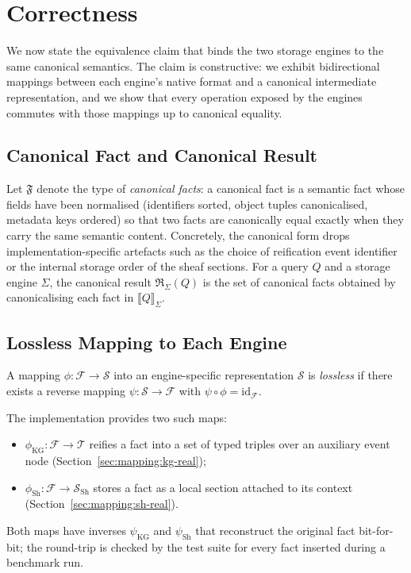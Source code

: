 \section{Correctness}
\label{sec:correctness}

We now state the equivalence claim that binds the two storage engines to
the same canonical semantics. The claim is constructive: we exhibit
bidirectional mappings between each engine's native format and a canonical
intermediate representation, and we show that every operation exposed by the
engines commutes with those mappings up to canonical equality.

\subsection{Canonical Fact and Canonical Result}
\label{sec:correctness:canonical}

Let $\mathfrak{F}$ denote the type of \emph{canonical facts}: a canonical fact
is a semantic fact whose fields have been normalised (identifiers sorted,
object tuples canonicalised, metadata keys ordered) so that two facts are
canonically equal exactly when they carry the same semantic content.
Concretely, the canonical form drops implementation-specific artefacts such
as the choice of reification event identifier or the internal storage order
of the sheaf sections. For a query $Q$ and a storage engine $\Sigma$, the
canonical result $\mathfrak{R}_\Sigma(Q)$ is the set of canonical facts
obtained by canonicalising each fact in $\llbracket Q \rrbracket_\Sigma$.

\subsection{Lossless Mapping to Each Engine}
\label{sec:correctness:lossless}

\begin{definition}
\label{def:lossless}
A mapping $\phi: \mathcal{F} \to \mathcal{S}$ into an engine-specific
representation $\mathcal{S}$ is \emph{lossless} if there exists a reverse
mapping $\psi: \mathcal{S} \to \mathcal{F}$ with $\psi \circ \phi = \mathrm{id}_\mathcal{F}$.
\end{definition}

The implementation provides two such maps:
\begin{itemize}
    \item $\phi_{\mathrm{KG}}: \mathcal{F} \to \mathcal{T}$ reifies a fact
          into a set of typed triples over an auxiliary event node
          (Section~\ref{sec:mapping:kg-real});
    \item $\phi_{\mathrm{Sh}}: \mathcal{F} \to \mathcal{S}_{\mathrm{Sh}}$
          stores a fact as a local section attached to its context
          (Section~\ref{sec:mapping:sh-real}).
\end{itemize}
Both maps have inverses $\psi_{\mathrm{KG}}$ and $\psi_{\mathrm{Sh}}$ that
reconstruct the original fact bit-for-bit; the round-trip is checked by the
test suite for every fact inserted during a benchmark run.

